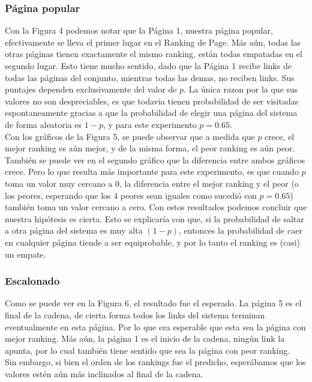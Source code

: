 \subsubsection{Página popular}
Con la Figura 4 podemos notar que la Página 1, nuestra página popular, efectivamente se lleva el primer lugar en el Ranking de Page.
Más aún, todas las otras páginas tienen exactamente el mismo ranking, están todas empatadas en el segundo lugar.
Esto tiene mucho sentido, dado que la Página 1 recibe links de todas las páginas del conjunto, mientras todas las demas, no reciben links.
Sus puntajes dependen exclusivamente del valor de $p$. La única razon por la que sus valores no son despreciables, es que todavia tienen
probabilidad de ser visitadas espontaneamente gracias a que la probabilidad de elegir una página del sistema de forma aleatoria es $1 - p$, y para este experimento $p = 0.65$.\\

Con los gráficos de la Figura 5, se puede observar que a medida que $p$ crece, el mejor ranking es aún mejor, y de la misma forma,
el peor ranking es aún peor. También se puede ver en el segundo gráfico que la diferencia entre ambos gráficos crece. Pero lo que resulta más importante para este experimento, es que cuando $p$ toma un valor muy cercano a 0, la diferencia entre el mejor ranking y el peor (o los peores, esperando que los 4 peores sean iguales como sucedió con $p = 0.65$) también toma un valor cercano a cero.
Con estos resultados podemos concluir que nuestra hipótesis es cierta. Esto se explicaría con que, si la probabilidad de saltar
a otra página del sistema es muy alta $(1 - p)$, entonces la probabilidad de caer en cualquier página tiende a ser equiprobable, y por lo tanto el ranking es (casi) un empate.

\subsubsection{Escalonado}
Como se puede ver en la Figura 6, el resultado fue el esperado. La página 5 es el final de la cadena, de cierta forma todos los links del sistema terminan eventualmente en esta página.
Por lo que era esperable que esta sea la página con mejor ranking. Más aún, la página 1 es el inicio de la cadena, ningún link la apunta, por lo cual también tiene
sentido que sea la página con peor ranking. \\

Sin embargo, si bien el orden de los rankings fue el predicho, esperábamos que los valores estén aún más inclinados al final de la cadena.\\

